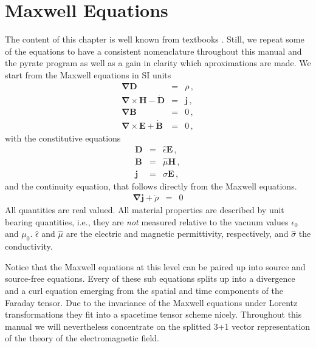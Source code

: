 \documentclass[12pt,a4paper,twoside,openright,BCOR10mm,headsepline,titlepage,abstracton,chapterprefix,final]{scrreprt}
\newcommand\Vector[1]{{\mathbf{#1}}}
\newcommand\vacuum{0}
\newcommand\Nabla{\Vector{\nabla}}
\newcommand\timederivative[1]{\dot{{#1}}}
\newcommand\Tensor[1]{\hat{#1}}
\newcommand\scalarEfield{E}
\newcommand\scalarBfield{B}
\newcommand\scalarHfield{H}
\newcommand\scalarDfield{D}
\newcommand\Efield{\Vector{\scalarEfield}}
\newcommand\Bfield{\Vector{\scalarBfield}}
\newcommand\Hfield{\Vector{\scalarHfield}}
\newcommand\Dfield{\Vector{\scalarDfield}}
\newcommand\permeability{\Tensor{\mu}}
\newcommand\vacuumpermeability{\mu_{\vacuum}}
\newcommand\permittivity{\Tensor{\epsilon}}
\newcommand\vacuumpermittivity{\epsilon_{\vacuum}}
\newcommand\conductivity{\Tensor{\sigma}}
\newcommand\currentdensity{\Vector{j}}
\newcommand\chargedensity{\rho}
\newcommand{\chk}[1]{\color{green}{$\checkmark$#1}}
\begin{document}
\section{Maxwell Equations\chk{JH}}
The content of this chapter is well known from textbooks \cite{Jackson}. Still, we repeat some of the equations to have a consistent 
nomenclature throughout this manual and the pyrate program as well as a gain in clarity which aproximations are made.
We start from the Maxwell equations in SI units
\begin{subequations}\label{eq:Maxwell}
\begin{eqnarray}
  \Nabla \Dfield &=& \chargedensity\,, 							\label{eq:MaxwellNablaD}\\
  \Nabla \times \Hfield -\timederivative{\Dfield} &=&  \currentdensity\,,  		\label{eq:MaxwellNablaCrossH} \\
  \Nabla \Bfield &=& 0\,,  									\label{eq:MaxwellNablaB} \\
  \Nabla \times \Efield + \timederivative{\Bfield} &=& 0\,,   					\label{eq:MaxwellNablaCrossE}
\end{eqnarray}
\end{subequations}
with the constitutive equations
\begin{subequations}\label{eq:Material}
\begin{eqnarray}
  \Dfield &=& \permittivity \Efield\,, 								\label{eq:ConstitutiveEpsilon}\\
  \Bfield &=& \permeability \Hfield\,, 								\label{eq:ConstitutiveMu}\\
  \currentdensity &=& \conductivity \Efield\,,						\label{eq:ConstitutiveSigma}
\end{eqnarray}
\end{subequations}
and the continuity equation, that follows directly from the Maxwell equations.
\begin{eqnarray}
  \Nabla \currentdensity + \timederivative{\chargedensity} &=& 0		\label{eq:continuity}
\end{eqnarray}
All quantities are real valued. All material properties are described by unit bearing quantities, i.e., 
they are \emph{not} measured relative to the vacuum values $\vacuumpermittivity$ and $\vacuumpermeability$. 
$\permittivity$ and $\permeability$ are the electric and magnetic permittivity, respectively, and $\conductivity$ the conductivity. 

Notice that the Maxwell equations at this level can be paired up into source and source-free equations. Every of these sub equations
splits up into a divergence and a curl equation emerging from the spatial and time components of the Faraday tensor. Due to the
invariance of the Maxwell equations under Lorentz transformations they fit into a spacetime tensor scheme nicely. Throughout this manual
we will nevertheless concentrate on the splitted 3+1 vector representation of the theory of the electromagnetic field.
\end{document}
